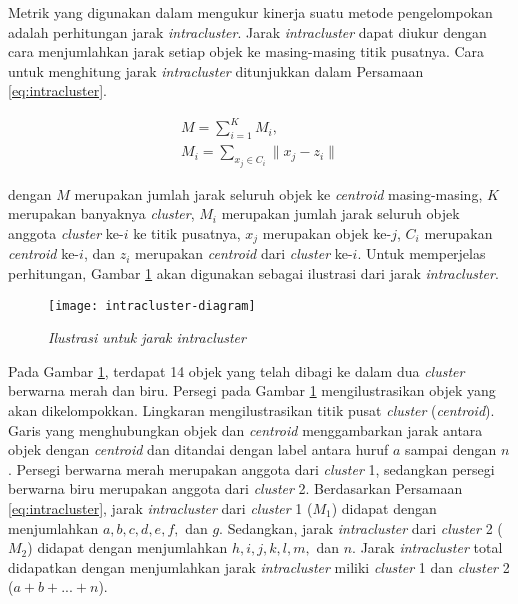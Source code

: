 Metrik yang digunakan \cite{maulik2000genetic} dalam mengukur kinerja suatu metode pengelompokan adalah perhitungan jarak \textit{intracluster}. Jarak \textit{intracluster} dapat diukur dengan cara menjumlahkan jarak setiap objek ke masing-masing titik pusatnya. Cara untuk menghitung jarak \textit{intracluster} ditunjukkan dalam Persamaan \ref{eq:intracluster}.

\begin{equation}
\label{eq:intracluster}
	\begin{gathered}
	M=\sum_{i=1}^K M_i , \\
	M_i=\sum_{x_j\in C_i}\parallel x_j-z_i\parallel
	\end{gathered}
\end{equation}

dengan $M$ merupakan jumlah jarak seluruh objek ke \textit{centroid} masing-masing, $K$ merupakan banyaknya \textit{cluster}, $M_i$ merupakan jumlah jarak seluruh objek anggota \textit{cluster} ke-$i$ ke titik pusatnya, $x_j$ merupakan objek ke-$j$, $C_i$ merupakan \textit{centroid} ke-$i$, dan $z_i$ merupakan \textit{centroid} dari \textit{cluster} ke-$i$. Untuk memperjelas perhitungan, Gambar \ref{fig:intracluster} akan digunakan sebagai ilustrasi dari jarak \textit{intracluster}.

\begin{figure}[h]
	\begin{center}
		\texttt{[image: intracluster-diagram]}
		\caption{\textit{Ilustrasi untuk jarak \textit{intracluster}}}
		\label{fig:intracluster}
	\end{center}
\end{figure}

Pada Gambar \ref{fig:intracluster}, terdapat 14 objek yang telah dibagi ke dalam dua \textit{cluster} berwarna merah dan biru. Persegi pada Gambar \ref{fig:intracluster} mengilustrasikan objek yang akan dikelompokkan. Lingkaran mengilustrasikan titik pusat \textit{cluster} (\textit{centroid}). Garis yang menghubungkan objek dan \textit{centroid} menggambarkan jarak antara objek dengan \textit{centroid} dan ditandai dengan label antara huruf $a$ sampai dengan $n$. Persegi berwarna merah merupakan anggota dari \textit{cluster} 1, sedangkan persegi berwarna biru merupakan anggota dari \textit{cluster} 2. Berdasarkan Persamaan \ref{eq:intracluster}, jarak \textit{intracluster} dari \textit{cluster} 1 ($M_1$) didapat dengan menjumlahkan $a, b, c, d, e, f,$ dan $g$. Sedangkan, jarak \textit{intracluster} dari \textit{cluster} 2 ($M_2$) didapat dengan menjumlahkan $h, i, j, k, l, m,$ dan $n$. Jarak \textit{intracluster} total didapatkan dengan menjumlahkan jarak \textit{intracluster} miliki \textit{cluster} 1 dan \textit{cluster} 2 ($a + b + ... + n$).

